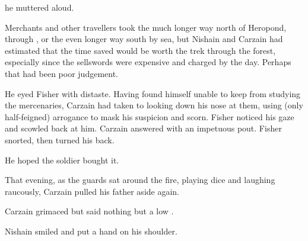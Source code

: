 
 he muttered aloud. 

Merchants and other travellers took the much longer way north of Heropond, through , or the even longer way south by sea, but Nishain and Carzain had estimated that the time saved would be worth the trek through the forest, especially since the sellswords were expensive and charged by the day. 
Perhaps that had been poor judgement. 

He eyed Fisher with distaste. 
Having found himself unable to keep from studying the mercenaries, Carzain had taken to looking down his nose at them, using (only half-feigned) arrogance to mask his suspicion and scorn. Fisher noticed his gaze and scowled back at him. Carzain answered with an impetuous pout. Fisher snorted, then turned his back. 

He hoped the soldier bought it. 



That evening, as the guards sat around the fire, playing dice and laughing raucously, Carzain pulled his father aside again. 


Carzain grimaced but said nothing but a low . 

Nishain smiled and put a hand on his shoulder. 




